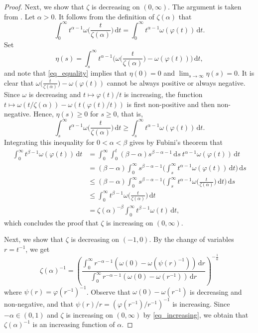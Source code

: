 \documentclass{amsart}
\renewcommand{\d}{\,\mathrm{d}}
\begin{document}
\begin{proof}
Next, we show that 
$\zeta$ is decreasing on $(0,\infty)$. The argument is taken from \cite[Lemma~2.6]{Milman:Pajor}.
Let $\alpha>0$. It follows from the definition of $\zeta(\alpha)$ that
\begin{equation}\label{eq_equality}
    \int_0^\infty t^{\alpha-1} \omega\big(\frac t{\zeta(\alpha)}\big)\d t = \int_0^\infty t^{\alpha-1} \omega(\varphi(t))\d t.
\end{equation}
Set
\begin{equation}
    \eta(s)=\int_s^\infty t^{\alpha-1} \big(\omega\big(\frac t{\zeta(\alpha)}\big)-\omega(\varphi(t))\big)\d t,
\end{equation}
and note that \eqref{eq_equality} implies that $\eta(0)=0$ and $\lim_{s\to\infty} \eta(s)=0$. It is clear that $\omega\big(\frac t{\zeta(\alpha)}\big)-\omega(\varphi(t))$ cannot be always positive or always negative. Since $\omega$ is decreasing and $t\mapsto \varphi(t)/t$ is increasing, the function 
$t\mapsto \omega(t/ \zeta(\alpha))- \omega(t( \varphi(t)/t))$
is first non-positive and then non-negative. Hence, $\eta(s)\ge 0$ for $s\ge 0$, that is,
\begin{equation}
\int_s^\infty t^{\alpha-1} \omega\big(\frac t{\zeta(\alpha)}\big)\d t \ge \int_s^\infty t^{\alpha-1} \omega(\varphi(t))\d t.
\end{equation}
Integrating this inequality for $0<\alpha< \beta$ gives by Fubini's theorem that
\begin{equation}\label{eq_increasing}
    \begin{split}
        \int_0^\infty t^{\beta-1} \omega(\varphi(t)) \d t
        &= \int_0^\infty \int_0^t (\beta -\alpha) s^{\beta-\alpha-1} \d s \ 
        t^{\alpha-1}\omega(\varphi(t))\d t\\
        &= (\beta -\alpha) \int_0^\infty s^{\beta-\alpha-1}\Big(\int_s^\infty t^{\alpha-1}\omega(\varphi(t))\d t\Big)\d s \\
        &\le (\beta-\alpha) \int_0^\infty s^{\beta-\alpha-1} \Big( \int_s^\infty t^{\alpha-1} \omega\big(\frac t{\zeta(\alpha)}\big)\d t\Big) \d s\\
        &\le \int_0^\infty t^{\beta-1} \omega\big(\frac t{\zeta(\alpha)}\big) \d t\\
        &= \zeta(\alpha)^{-\beta} \int_0^\infty t^{\beta-1} \omega(t)\d t,
     \end{split}
\end{equation}
which concludes the proof that $\zeta$ is increasing on $(0, \infty)$.

Next, we show that $\zeta$ is decreasing on $(-1,0)$.
By the change of variables $r = t^{-1}$, we get
\[
\zeta(\alpha)^{-1}=\left(\frac{\int_0^{\infty} r^{-\alpha-1} (\omega(0)-\omega(\psi (r)^{-1})) \d r}{\int_0^{\infty }  r^{-\alpha-1} (\omega(0)-\omega(r^{-1}))  \d r}\right)^{-\frac{1}{\alpha}}
\]
where $\psi(r)=\varphi(r^{-1})^{-1}$. Observe that $\omega(0)-\omega(r^{-1})$ is decreasing and non-negative, and that ${\psi(r)}/r = \left({\varphi(r^{-1})}/{r^{-1}}\right)^{-1}$ is increasing.
Since $-\alpha \in (0,1)$ and $\zeta$ is increasing on $(0,\infty)$ by \eqref{eq_increasing}, we obtain that $\zeta(\alpha)^{-1}$ is an increasing function of $\alpha$.


\end{proof}
\end{document}

